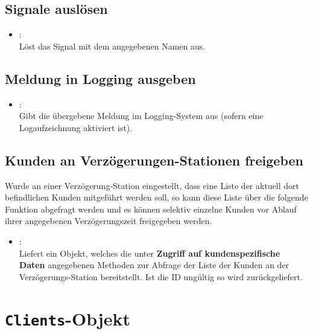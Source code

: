 \section{Signale auslösen}

\begin{itemize}

\item
{}:\\
Löst das Signal mit dem angegebenen Namen aus.

\end{itemize}

\section{Meldung in Logging ausgeben}

\begin{itemize}

\item
{}:\\
Gibt die übergebene Meldung im Logging-System aus (sofern eine Logaufzeichnung aktiviert ist).

\end{itemize}

\section{Kunden an Verzögerungen-Stationen freigeben}

Wurde an einer Verzögerung-Station eingestellt, dass eine Liste der aktuell dort befindlichen Kunden
mitgeführt werden soll, so kann diese Liste über die folgende Funktion abgefragt werden und es können
selektiv einzelne Kunden vor Ablauf ihrer angegebenen Verzögerungszeit freigegeben werden.

\begin{itemize}

\item
{}:\\
Liefert ein Objekt, welches die unter \textbf{Zugriff auf kundenspezifische Daten} angegebenen Methoden
zur Abfrage der Liste der Kunden an der Verzögerungs-Station  bereitstellt. Ist die ID ungültig
so wird  zurückgeliefert.

\end{itemize}



\chapter{\texttt{Clients}-Objekt}

